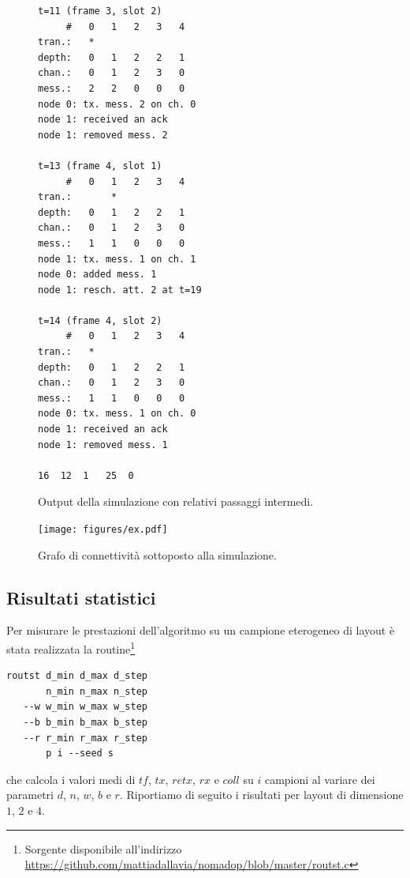 \documentclass[a4paper,11pt]{article}
\theoremstyle{definition}
\begin{document}
\begin{figure}[H]
\begin{multicols}{3}
\begin{Verbatim}[fontsize=\scriptsize,tabsize=2]
t=11 (frame 3, slot 2)
     #   0   1   2   3   4 
tran.:   *                 
depth:   0   1   2   2   1 
chan.:   0   1   2   3   0 
mess.:   2   2   0   0   0 
node 0: tx. mess. 2 on ch. 0
node 1: received an ack
node 1: removed mess. 2

t=13 (frame 4, slot 1)
     #   0   1   2   3   4 
tran.:       *             
depth:   0   1   2   2   1 
chan.:   0   1   2   3   0 
mess.:   1   1   0   0   0 
node 1: tx. mess. 1 on ch. 1
node 0: added mess. 1
node 1: resch. att. 2 at t=19

t=14 (frame 4, slot 2)
     #   0   1   2   3   4 
tran.:   *                 
depth:   0   1   2   2   1 
chan.:   0   1   2   3   0 
mess.:   1   1   0   0   0 
node 0: tx. mess. 1 on ch. 0
node 1: received an ack
node 1: removed mess. 1

16	12	1	25	0
\end{Verbatim}
\end{multicols}
\caption{Output della simulazione con relativi passaggi intermedi.}
\end{figure}


\begin{figure}[H]
\centering
\texttt{[image: figures/ex.pdf]}
\caption{Grafo di connettività sottoposto alla simulazione.}
\end{figure}

\subsection{Risultati statistici}

Per misurare le prestazioni dell'algoritmo su un campione eterogeneo di layout è stata realizzata la routine\footnote{Sorgente disponibile all'indirizzo \url{https://github.com/mattiadallavia/nomadop/blob/master/routst.c}}

\smallskip

{\centering
\begin{BVerbatim}
routst d_min d_max d_step
       n_min n_max n_step
   --w w_min w_max w_step
   --b b_min b_max b_step
   --r r_min r_max r_step
       p i --seed s
\end{BVerbatim}

}

che calcola i valori medi di $tf$, $tx$, $retx$, $rx$ e $coll$ su $i$ campioni al variare dei parametri $d$, $n$, $w$, $b$ e $r$. Riportiamo di seguito i risultati per layout di dimensione $1$, $2$ e $4$.
\end{document}
